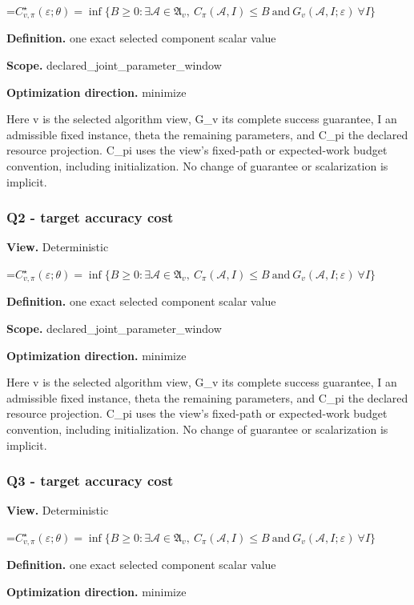 \documentclass[10pt,a4paper]{article}
\newcommand{\AtlasMath}[1]{\par\begingroup\centering\setbox0=\hbox{$\displaystyle #1$}\ifdim\wd0>1.4\linewidth\typeout{ATLAS WIDE FORMULA: \the\wd0}\fi\ifdim\wd0>\linewidth\resizebox{\linewidth}{!}{\box0}\else\box0\fi\par\endgroup}
\begin{document}
\AtlasMath{C^\star_{v,\pi}(\varepsilon;\theta)=\inf\{B\ge0:\exists\mathcal A\in\mathfrak A_v,\ C_\pi(\mathcal A,I)\le B\ \text{and}\ G_v(\mathcal A,I;\varepsilon)\ \forall I\}}
\textbf{Definition.} one exact selected component scalar value

\textbf{Scope.} declared\_joint\_parameter\_window

\textbf{Optimization direction.} minimize

Here v is the selected algorithm view, G\_v its complete success guarantee, I an admissible fixed instance, theta the remaining parameters, and C\_pi the declared resource projection. C\_pi uses the view's fixed-path or expected-work budget convention, including initialization. No change of guarantee or scalarization is implicit.

\subsubsection{Q2 - target accuracy cost}
\textbf{View.} Deterministic

\AtlasMath{C^\star_{v,\pi}(\varepsilon;\theta)=\inf\{B\ge0:\exists\mathcal A\in\mathfrak A_v,\ C_\pi(\mathcal A,I)\le B\ \text{and}\ G_v(\mathcal A,I;\varepsilon)\ \forall I\}}
\textbf{Definition.} one exact selected component scalar value

\textbf{Scope.} declared\_joint\_parameter\_window

\textbf{Optimization direction.} minimize

Here v is the selected algorithm view, G\_v its complete success guarantee, I an admissible fixed instance, theta the remaining parameters, and C\_pi the declared resource projection. C\_pi uses the view's fixed-path or expected-work budget convention, including initialization. No change of guarantee or scalarization is implicit.

\subsubsection{Q3 - target accuracy cost}
\textbf{View.} Deterministic

\AtlasMath{C^\star_{v,\pi}(\varepsilon;\theta)=\inf\{B\ge0:\exists\mathcal A\in\mathfrak A_v,\ C_\pi(\mathcal A,I)\le B\ \text{and}\ G_v(\mathcal A,I;\varepsilon)\ \forall I\}}
\textbf{Definition.} one exact selected component scalar value

\textbf{Optimization direction.} minimize
\end{document}

